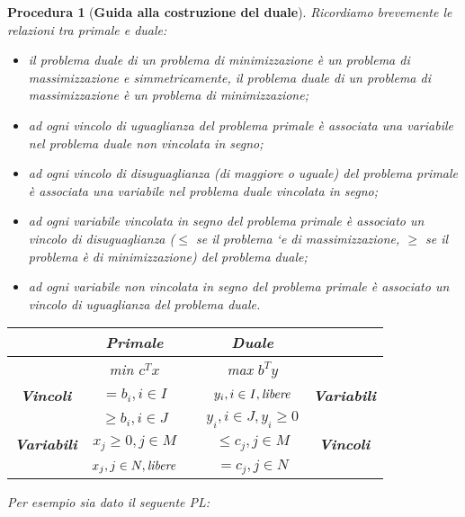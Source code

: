 \documentclass[10pt,a4paper,titlepage]{article}
\theoremstyle{break}
\theoremstyle{break}
\newtheorem{myProced}{Procedura}
\theoremstyle{break}
\begin{document}
\begin{myProced}[\textbf{Guida alla costruzione del duale}]

Ricordiamo brevemente le relazioni tra primale e duale:
\begin{itemize}
\item il problema duale di un problema di minimizzazione è un problema di massimizzazione e simmetricamente, il problema duale di un problema di massimizzazione è un problema di minimizzazione;
\item ad ogni vincolo di uguaglianza del problema primale è associata una variabile nel problema duale non vincolata in segno;
\item ad ogni vincolo di disuguaglianza (di maggiore o uguale) del problema primale è associata una variabile nel problema duale vincolata in segno;
\item ad ogni variabile vincolata in segno del problema primale è associato un vincolo di disuguaglianza ($\leq$ se il problema `e di massimizzazione, $\geq$ se il problema è di minimizzazione) del problema duale;
\item ad ogni variabile non vincolata in segno del problema primale è associato un vincolo di uguaglianza del problema duale.
\end{itemize}

\begin{center}
\begin{tabular}{c|ccc|c}


& \textbf{Primale} && \textbf{Duale} & \\\hline

& min $c^Tx$ && max $b^Ty$ \\\hline

\textbf{Vincoli} & $= b_i, i \in I$ && $y_i, i \in I, \text{\textit{libere}}$ & \textbf{Variabili} \\

& $\geq b_i, i \in J$ && $y_i, i \in J, y_i \geq 0 $ \\\hline

\textbf{Variabili} & $x_j \geq 0, j \in M$ && $\leq c_j, j \in M$ & \textbf{Vincoli}\\

& $x_j, j \in N, \text{\textit{libere}}$ && $= c_j, j \in N$ \\

\end{tabular}
\end{center}

Per esempio sia dato il seguente PL:


\end{myProced}
\end{document}
